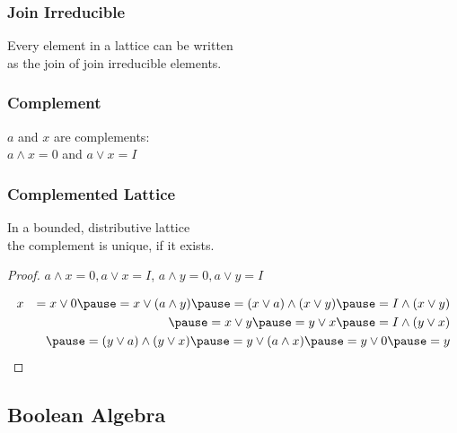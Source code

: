 \documentclass[dvipsnames]{beamer}
\begin{document}
\begin{frame}
  \frametitle{Join Irreducible}

  \begin{theorem}
    Every element in a lattice can be written\\
    as the join of join irreducible elements.
  \end{theorem}
\end{frame}

\begin{frame}
  \frametitle{Complement}

  \begin{definition}
    $a$ and $x$ are \alert{complements}:\\
    $a \wedge x = 0$ and $a \vee x = I$
  \end{definition}
\end{frame}

\begin{frame}
  \frametitle{Complemented Lattice}

  \begin{theorem}
    In a bounded, distributive lattice\\
    the complement is unique, if it exists.
  \end{theorem}

  \pause
  \begin{proof}
    $a \wedge x = 0, a \vee x = I$, $a \wedge y = 0, a \vee y = I$

    \pause
    \medskip
    \begin{eqnarray*}
  & x & = x \vee 0 \pause = x \vee (a \wedge y) \pause = (x \vee a) \wedge (x \vee y) \pause = I \wedge (x \vee y)\\
  &   & \pause = x \vee y \pause = y \vee x \pause = I \wedge (y \vee x)\\
  &   & \pause = (y \vee a) \wedge (y \vee x) \pause = y \vee (a \wedge x) \pause = y \vee 0 \pause = y\\
    \end{eqnarray*}
  \end{proof}
\end{frame}

\subsection{Boolean Algebra}
\end{document}
